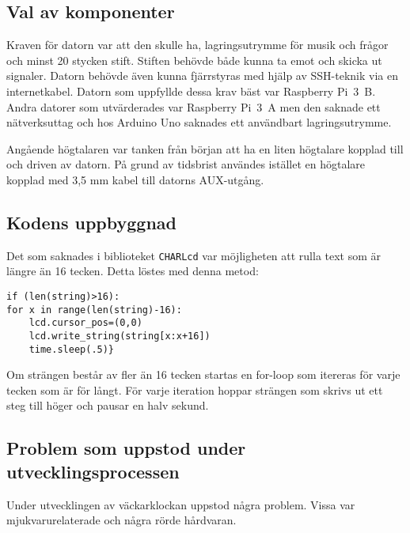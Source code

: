 
\subsection{Val av komponenter}
Kraven för datorn var att den skulle ha, lagringsutrymme för musik och frågor och minst 20 stycken stift. Stiften behövde både kunna ta emot och skicka ut signaler. Datorn behövde även kunna fjärrstyras med hjälp av SSH-teknik via en internetkabel. Datorn som uppfyllde dessa krav bäst var Raspberry Pi~3~B. Andra datorer som utvärderades var Raspberry Pi~3~A men den saknade ett nätverksuttag och hos Arduino Uno saknades ett användbart lagringsutrymme.

Angående högtalaren var tanken från början  att ha en liten högtalare kopplad till och driven av datorn. På grund av tidsbrist användes istället en högtalare kopplad med 3,5 mm kabel till datorns AUX-utgång.


\subsection{Kodens uppbyggnad}
Det som saknades i biblioteket \texttt{CHARLcd} var möjligheten att rulla text som är längre än 16 tecken. Detta löstes med denna metod: \begin{verbatim}
if (len(string)>16): 
for x in range(len(string)-16):
    lcd.cursor_pos=(0,0)
    lcd.write_string(string[x:x+16])
    time.sleep(.5)}
\end{verbatim}
Om strängen består av fler än 16 tecken startas en for-loop som itereras för varje tecken som är för långt. För varje iteration hoppar strängen som skrivs ut ett steg till höger och pausar en halv sekund.  






\subsection{Problem som uppstod under utvecklingsprocessen}
Under utvecklingen av väckarklockan uppstod några problem. Vissa var mjukvarurelaterade och några rörde hårdvaran.

